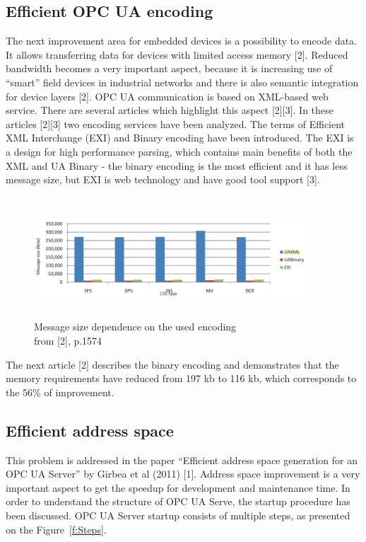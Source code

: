\documentclass[conference]{IEEEtran}
\begin{document}
\subsection{Efficient OPC UA encoding}
The next improvement area for embedded devices is a possibility to encode data. It allows transferring data for devices with limited access memory [2]. Reduced bandwidth becomes a very important aspect, because it is increasing use of “smart” field devices in industrial networks and there is also semantic integration for device layers [2]. OPC UA communication is based on XML-based web service. There are several articles which highlight this aspect [2][3]. In these articles [2][3] two encoding services have been analyzed. The terms of Efficient XML Interchange (EXI) and Binary encoding have been introduced. The EXI is a design for high performance parsing, which contains main benefits of both the XML and UA Binary - the binary encoding is the most efficient and it has less message size, but EXI is web technology and have good tool support [3].

\begin{figure}[ht]
\centering
\includegraphics[height=45mm, width = 4in]{Figures/encoding}\quad
\caption[Subfigure example]{\label{f:encoding}Message size dependence on the used encoding\\ from [2], p.1574}
\end{figure}


The next article [2] describes the binary encoding and demonstrates that the memory requirements have reduced from 197 kb to 116 kb, which corresponds to the 56\% of improvement.


\subsection{Efficient address space}
This problem is addressed in the paper “Efficient address space generation for an OPC UA Server” by Girbea et al (2011) [1]. Address space improvement is a very important aspect to get the speedup for development and maintenance time. In order to understand the structure of OPC UA Serve, the startup procedure has been discussed. OPC UA Server startup consists of multiple steps, as presented on the Figure~\ref{f:Steps}. 
\end{document}
